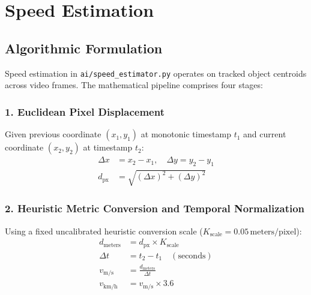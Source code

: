 \chapter{Speed Estimation}

\section{Algorithmic Formulation}
Speed estimation in \texttt{ai/speed\_estimator.py} operates on tracked object centroids across video frames. The mathematical pipeline comprises four stages:

\subsection{1. Euclidean Pixel Displacement}
Given previous coordinate $(x_1, y_1)$ at monotonic timestamp $t_1$ and current coordinate $(x_2, y_2)$ at timestamp $t_2$:
\begin{align}
\Delta x &= x_2 - x_1, \quad \Delta y = y_2 - y_1 \\
d_{\text{px}} &= \sqrt{(\Delta x)^2 + (\Delta y)^2}
\end{align}

\subsection{2. Heuristic Metric Conversion and Temporal Normalization}
Using a fixed uncalibrated heuristic conversion scale ($K_{\text{scale}} = 0.05\,\text{meters/pixel}$):
\begin{align}
d_{\text{meters}} &= d_{\text{px}} \times K_{\text{scale}} \\
\Delta t &= t_2 - t_1 \quad (\text{seconds}) \\
v_{\text{m/s}} &= \frac{d_{\text{meters}}}{\Delta t} \\
v_{\text{km/h}} &= v_{\text{m/s}} \times 3.6
\end{align}


